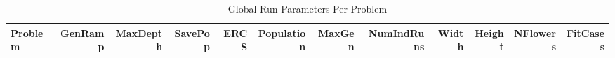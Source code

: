 \begin{table}[H]
\caption{Global Run Parameters Per Problem}
\begin{center}
\scalebox{0.8} %
{
\begin{tabular}{lrrrrrrrrrrr}
\hline
Problem & GenRamp & MaxDepth & SavePop & ERCS & Population & MaxGen & NumIndRuns & Width & Height & NFlowers & FitCases \\
\hline


\end{tabular}
}
\end{center}
\end{table}

